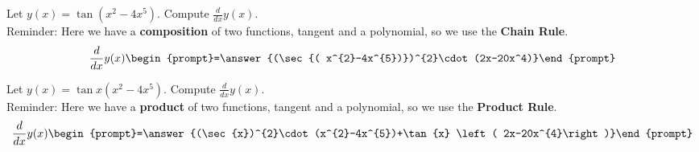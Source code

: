 \documentclass{ximera}
\author{Bart Snapp\and Nela lakos}
\begin{document}
\begin{exercise}
Let $y(x) = \tan{ \left( x^{2}-4x^{5}\right)}$. Compute $\frac{d}{dx}y(x)$.\\

Reminder: Here we have a \textbf{composition} of two functions, tangent and a polynomial, so we use the \textbf{Chain Rule}.
\[
\frac{d}{dx}y(x)
\begin{prompt}=\answer{(\sec{( x^{2}-4x^{5})})^{2}\cdot(2x-20x^4)}\end{prompt}
\]

\end{exercise}
\begin{exercise}
Let $y(x) = \tan{x} \left( x^{2}-4x^{5}\right)$. Compute $\frac{d}{dx}y(x)$.\\

Reminder: Here we have a \textbf{product} of two functions, tangent and a polynomial, so we use the\textbf{ Product Rule}.
\[
\frac{d}{dx}y(x)
\begin{prompt}=\answer{(\sec{x})^{2}\cdot(x^{2}-4x^{5})+\tan{x} \left( 2x-20x^{4}\right)}\end{prompt}
\]
\end{exercise}
\end{document}

